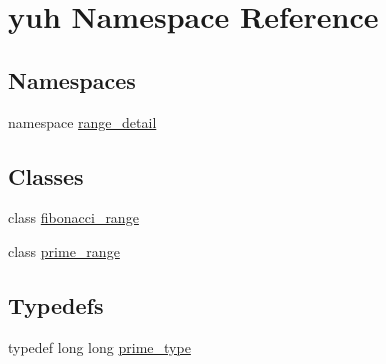 \hypertarget{namespaceyuh}{\section{yuh \-Namespace \-Reference}
\label{d5/d2b/namespaceyuh}
}
\subsection*{\-Namespaces}
\begin{DoxyCompactItemize}
\item 
namespace \hyperlink{namespaceyuh_1_1range__detail}{range\-\_\-detail}
\end{DoxyCompactItemize}
\subsection*{\-Classes}
\begin{DoxyCompactItemize}
\item 
class \hyperlink{classyuh_1_1fibonacci__range}{fibonacci\-\_\-range}
\item 
class \hyperlink{classyuh_1_1prime__range}{prime\-\_\-range}
\end{DoxyCompactItemize}
\subsection*{\-Typedefs}
\begin{DoxyCompactItemize}
\item 
typedef long long \hyperlink{namespaceyuh_af542f8440602da42322ddb7ea8242336}{prime\-\_\-type}
\end{DoxyCompactItemize}
